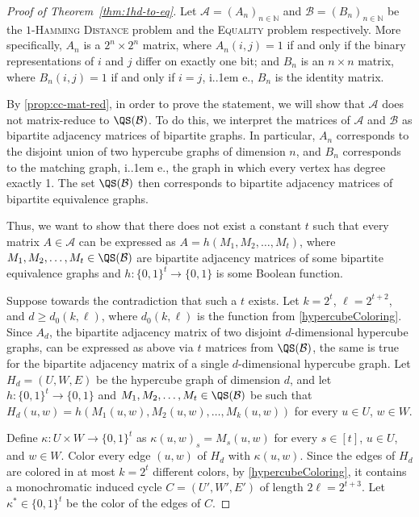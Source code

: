 \documentclass{article}
\makeatletter
\newcommand{\zo}{\{0,1\}}
\newcommand{\cA}{\ensuremath{\mathcal{A}}}
\newcommand{\cB}{\ensuremath{\mathcal{B}}}
\newcommand{\bN}{\ensuremath{\mathbb{N}}}
\newcommand*\ie{i.\kern.1em e.\@\xspace} %
\makeatother
\begin{document}
\begin{proof}[Proof of Theorem~\ref{thm:1hd-to-eq}]
	Let  $\cA=(A_n)_{n \in \bN}$ 
	and $\cB=(B_n)_{n \in \bN}$ be the \textsc{$1$-Hamming Distance} problem and the \textsc{Equality} problem respectively. 
	More specifically, $A_n$ is a $2^n \times 2^n$ matrix, where $A_n(i,j) = 1$ if and only if the binary representations of $i$ and $j$ differ on exactly one bit; and $B_n$ is an $n \times n$ matrix, where $B_n(i,j) = 1$ if and only if $i = j$, \ie, $B_n$ is the identity matrix.
	
	By \cref{prop:cc-mat-red}, in order to prove the statement, we will show that 
	$\cA$ does not matrix-reduce to $\QS(\cB)$.
	To do this, we interpret the matrices of $\cA$ and $\cB$ as bipartite adjacency matrices of bipartite graphs.
	In particular, $A_n$ corresponds to the disjoint union of two hypercube graphs of dimension $n$,
	and $B_n$ corresponds to the matching graph, \ie, the graph in which every vertex has degree exactly 1.
	The set $\QS(\cB)$ then corresponds to bipartite adjacency matrices of bipartite equivalence graphs.
	
	Thus, we want to show that there does not exist a constant $t$ such that
	every matrix $A \in \cA$ can be expressed as $A = h(M_1, M_2, \ldots, M_t)$, where $M_1, M_2, \ldots, M_t \in \QS(\cB)$ are bipartite adjacency matrices of some bipartite equivalence graphs and $h: \zo^t \rightarrow \zo$ is some Boolean function.

	Suppose towards the contradiction that such a $t$ exists. 
	Let $k = 2^t$, $\ell = 2^{t+2}$, and $d \geq d_0(k, \ell)$, where $d_0(k, \ell)$ is the function from \cref{hypercubeColoring}. 
	Since $A_d$, the bipartite adjacency matrix of two disjoint $d$-dimensional hypercube graphs, can be expressed as above via $t$ matrices from $\QS(\cB)$, the same is true for the bipartite adjacency matrix of a single $d$-dimensional hypercube graph.
	Let $H_d = (U,W,E)$ be the hypercube graph of dimension $d$, and let 
	$h: \zo^t \rightarrow \zo$ and $M_1, M_2, \ldots, M_t \in \QS(\cB)$ be such that $H_d(u,w) = h(M_1(u,w), M_2(u,w), \ldots, M_k(u,w))$ for every $u \in U$, $w \in W$.
	 
	Define $\kappa: U \times W \rightarrow \{0,1\}^t$ as $\kappa(u,w)_s = M_s(u,w)$
	for every $s \in [t]$, $u \in U$, and $w \in W$.
	Color every edge $(u,w)$ of $H_d$ with $\kappa(u,w)$.
	Since the edges of $H_d$ are colored in at most $k = 2^t$ different colors,
	by \cref{hypercubeColoring}, it contains a monochromatic 
	induced cycle $C = (U', W', E')$ of length $2 \ell = 2^{t+3}$.
	Let $\kappa^* \in \{0,1\}^t$ be the color of the edges of $C$.
	

\end{proof}
\end{document}
